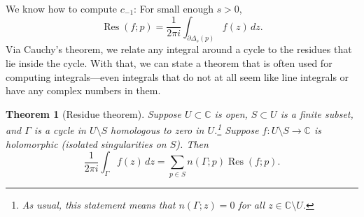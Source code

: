 \documentclass[12pt,openany]{book}
\newcommand{\C}{{\mathbb{C}}}
\theoremstyle{plain}
\newtheorem{thm}{Theorem}[section]
\theoremstyle{remark}
\theoremstyle{definition}
\theoremstyle{exercise}
\theoremstyle{example}
\begin{document}
We know how to compute $c_{-1}$: For small enough $s > 0$,
\begin{equation*}
\operatorname{Res}(f;p) 
=
\frac{1}{2\pi i} \int_{\partial \Delta_{s}(p)} f(z) \, dz .
\end{equation*}
Via Cauchy's theorem, we relate any integral around
a cycle to the residues that lie inside the cycle.
With that, we can state a theorem that is often used for computing
integrals---even integrals that do not at all seem like line integrals or
have any complex numbers in them.

\begin{thm}[Residue theorem]\label{thm:residue}
\pagebreak[2]
Suppose $U \subset \C$ is open, $S \subset U$ is a finite subset,
and $\Gamma$ is
a cycle
in $U \setminus S$
homologous to zero in $U$.\footnote{As usual, this statement means that
$n(\Gamma;z) = 0$ for all $z \in \C \setminus U$.}
Suppose $f \colon U \setminus S \to \C$ is holomorphic (isolated
singularities on $S$).
Then
\begin{equation*}
\frac{1}{2\pi i} \int_{\Gamma} f(z) \, dz = \sum_{p \in S} n(\Gamma;p) \operatorname{Res}(f;p) .
\end{equation*}
\end{thm}
\end{document}
